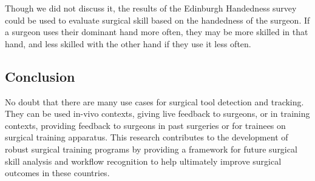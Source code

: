 Though we did not discuss it, the results of the Edinburgh Handedness survey \cite{oldfield_assessment_1971} could be used to evaluate surgical skill based on the handedness of the surgeon. If a surgeon uses their dominant hand more often, they may be more skilled in that hand, and less skilled with the other hand if they use it less often.




\subsection{Conclusion}

No doubt that there are many use cases for surgical tool detection and tracking. They can be used in-vivo contexts, giving live feedback to surgeons, or in training contexts, providing feedback to surgeons in past surgeries or for trainees on surgical training apparatus.
This research contributes to the development of robust surgical training programs by providing a framework for future surgical skill analysis and workflow recognition to help ultimately improve surgical outcomes in these countries.